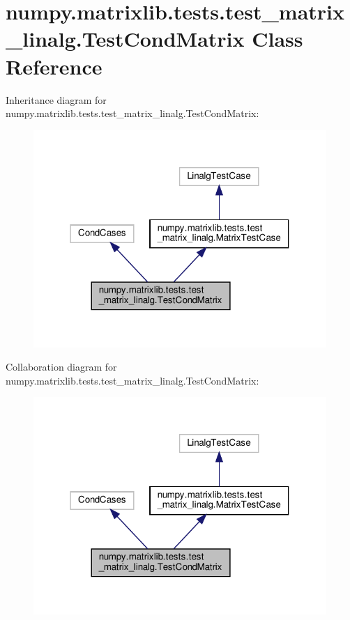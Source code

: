 \hypertarget{classnumpy_1_1matrixlib_1_1tests_1_1test__matrix__linalg_1_1TestCondMatrix}{}\section{numpy.\+matrixlib.\+tests.\+test\+\_\+matrix\+\_\+linalg.\+Test\+Cond\+Matrix Class Reference}
\label{classnumpy_1_1matrixlib_1_1tests_1_1test__matrix__linalg_1_1TestCondMatrix}


Inheritance diagram for numpy.\+matrixlib.\+tests.\+test\+\_\+matrix\+\_\+linalg.\+Test\+Cond\+Matrix\+:
\nopagebreak
\begin{figure}[H]
\begin{center}
\leavevmode
\includegraphics[width=315pt]{classnumpy_1_1matrixlib_1_1tests_1_1test__matrix__linalg_1_1TestCondMatrix__inherit__graph}
\end{center}
\end{figure}


Collaboration diagram for numpy.\+matrixlib.\+tests.\+test\+\_\+matrix\+\_\+linalg.\+Test\+Cond\+Matrix\+:
\nopagebreak
\begin{figure}[H]
\begin{center}
\leavevmode
\includegraphics[width=315pt]{classnumpy_1_1matrixlib_1_1tests_1_1test__matrix__linalg_1_1TestCondMatrix__coll__graph}
\end{center}
\end{figure}
